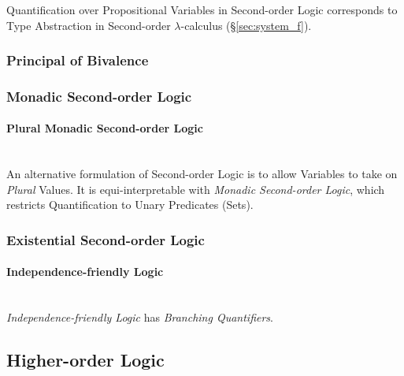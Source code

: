 Quantification over Propositional Variables in Second-order Logic
corresponds to Type Abstraction in Second-order $\lambda$-calculus
(\S\ref{sec:system_f}).



\subsubsection{Principal of Bivalence}\label{sec:bivalence_principal}

\subsubsection{Monadic Second-order Logic}\label{sec:monadic_secondorder}

\paragraph{Plural Monadic Second-order Logic}\hfill
\label{sec:plural_monadic_secondorder}\hfill \\

An alternative formulation of Second-order Logic is to allow Variables
to take on \emph{Plural} Values. It is equi-interpretable with
\emph{Monadic Second-order Logic}, which restricts Quantification to
Unary Predicates (Sets).



\subsubsection{Existential Second-order Logic}
\label{sec:existential_secondorder}

\paragraph{Independence-friendly\hfill
  Logic}\label{sec:independence_logic}\hfill \\

\emph{Independence-friendly Logic} has \emph{Branching Quantifiers}.



\subsection{Higher-order Logic}\label{sec:higherorder_logic}

